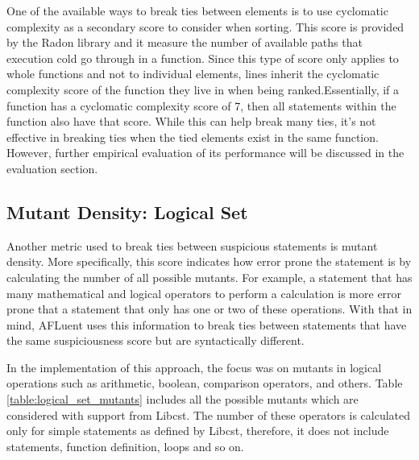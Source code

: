 One of the available ways to break ties between elements is to use cyclomatic
complexity as a secondary score to consider when sorting. This score is provided
by the Radon library and it measure the number of available paths that execution
cold go through in a function. Since this type of score only applies to whole
functions and not to individual elements, lines inherit the cyclomatic
complexity score of the function they live in when being ranked.Essentially, if
a function has a cyclomatic complexity score of 7, then all statements within
the function also have that score. While this can help break many ties, it's not
effective in breaking ties when the tied elements exist in the same function.
However, further empirical evaluation of its performance will be discussed in
the evaluation section.

\subsection{Mutant Density: Logical Set}
\label{subsec:tiebreak_mutant_density_logical}

Another metric used to break ties between suspicious statements is mutant
density. More specifically, this score indicates how error prone the statement
is by calculating the number of all possible mutants. For example, a statement
that has many mathematical and logical operators to perform a calculation is
more error prone that a statement that only has one or two of these operations.
With that in mind, AFLuent uses this information to break ties between
statements that have the same suspiciousness score but are syntactically
different.

In the implementation of this approach, the focus was on mutants in logical
operations such as arithmetic, boolean, comparison operators, and others.
Table \ref{table:logical_set_mutants} includes all the possible mutants which
are considered with support from Libcst. The number of these operators is
calculated only for simple statements as defined by Libcst, therefore, it does
not include  statements, function definition,  loops and so on.

